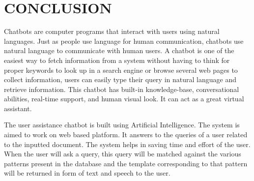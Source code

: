 \documentclass[12pt,a4paper,oneside]{report}
\begin{document}
\chapter{CONCLUSION}
Chatbots are computer programs that interact with users using natural languages. Just as people use language for human communication, chatbots use natural language to communicate with human users. A chatbot is one of the easiest way to fetch information from a system without having to think for proper keywords to look up in a search engine or browse several web pages to collect information, users can easily type their query in 
natural language and retrieve information. This chatbot has built-in knowledge-base, conversational abilities, real-time support, and human visual look. It can act as a great virtual assistant.
\par The user assistance chatbot is built using Artiﬁcial Intelligence. The system is aimed to work on web based platform. It answers to the queries of a user related to the inputted document. The system helps in saving time and effort of the user. When the user will ask a query, this query will be matched against the various patterns present in the database and the template corresponding to that pattern will be returned in form of text and speech to the user.\\  
 
\end{document}
